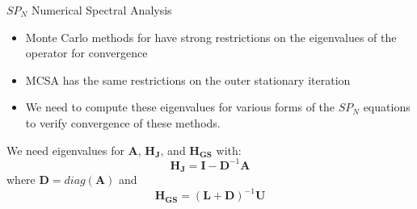 \documentclass{beamer}
\begin{document}
\begin{frame}{$SP_N$ Numerical Spectral Analysis}

  \begin{itemize}
    \item Monte Carlo methods for have strong restrictions on the
      eigenvalues of the operator for convergence
    \item MCSA has the same restrictions on the outer stationary
      iteration
    \item We need to compute these eigenvalues for various forms of
      the $SP_N$ equations to verify convergence of these methods.
  \end{itemize}

  We need eigenvalues for $\mathbf{A}$, $\mathbf{H_{J}}$, and
  $\mathbf{H_{GS}}$ with:
  \begin{equation}
    \mathbf{H_{J}} = \mathbf{I} - \mathbf{D}^{-1} \mathbf{A}
    \label{eq:jacobi_iteration_matrix}
  \end{equation}
  where $\mathbf{D} = diag(\mathbf{A})$ and 
  \begin{equation}
    \mathbf{H_{GS}} = (\mathbf{L+D})^{-1}\mathbf{U}
    \label{eq:gauss_seidel_iteration_matrix}
  \end{equation}

\end{frame}
\end{document}
